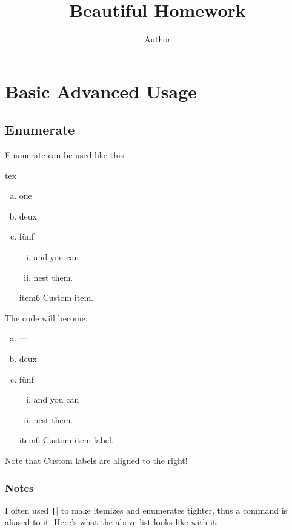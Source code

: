 \documentclass{fhw}
\title{Beautiful Homework}
\author{Author}
\begin{document}
\maketitle

\section{Basic Advanced Usage}

\subsection{Enumerate}

Enumerate can be used like this:
\begin{Code}{tex}
\begin{enumerate}[(a)]
  \item one
  \item deux
    \setcounter{enumi}{4}
  \item fünf
    \begin{enumerate}[i.]
      \item and you can
      \item nest them.
    \end{enumerate}
  \item[item6] Custom item.
\end{enumerate}
\end{Code}

The code will become: 

\begin{enumerate}[(a)]
	\item 一
	\item deux
	\setcounter{enumi}{4}
	\item fünf
		\begin{enumerate}[i.]
			\item and you can
			\item nest them.
		\end{enumerate}
	\item[item6] Custom item label.
\end{enumerate}

Note that Custom labels are aligned to the right!

\subsubsection{Notes}

I often used \texttt|\setlength{\itemsep}{0pt}\setlength{\parskip}{0pt}| to make itemizes and enumerates tighter,
thus a command \texttt{\tightlist} is aliased to it.
Here's what the above list looks like with it:
\end{document}
